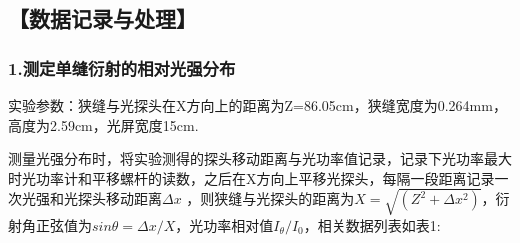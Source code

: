 \documentclass[12pt,a4paper,UTF8]{ctexart}
\begin{document}


\subsection*{【数据记录与处理】}
\subsubsection*{1.测定单缝衍射的相对光强分布}
实验参数：狭缝与光探头在X方向上的距离为Z=86.05cm，狭缝宽度为0.264mm，高度为2.59cm，光屏宽度15cm.

测量光强分布时，将实验测得的探头移动距离与光功率值记录，记录下光功率最大时光功率计和平移螺杆的读数，之后在X方向上平移光探头，每隔一段距离记录一次光强和光探头移动距离$\varDelta x$
，则狭缝与光探头的距离为$X=\sqrt{(Z^2+\varDelta x^2)}$，衍射角正弦值为$sinθ=\varDelta x/X$，光功率相对值$I_\theta/I_0$，相关数据列表如表1:
\end{document}
